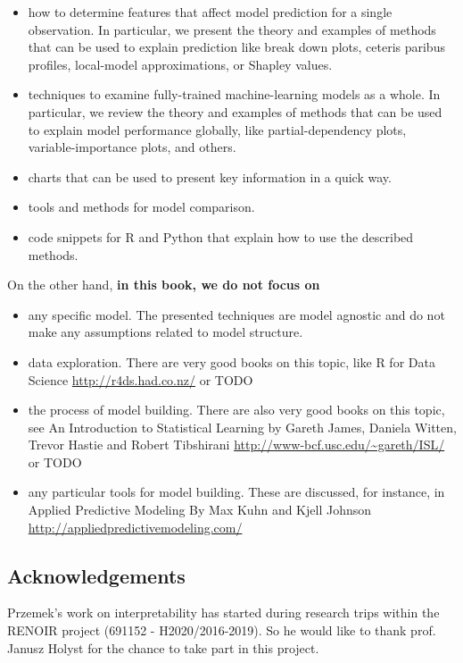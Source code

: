\documentclass[]{krantz}
\providecommand{\tightlist}{%
  \setlength{\itemsep}{0pt}\setlength{\parskip}{0pt}}
\theoremstyle{definition}
\theoremstyle{definition}
\theoremstyle{definition}
\theoremstyle{remark}
\begin{document}
\begin{itemize}
\tightlist
\item
  how to determine features that affect model prediction for a single
  observation. In particular, we present the theory and examples of
  methods that can be used to explain prediction like break down plots,
  ceteris paribus profiles, local-model approximations, or Shapley
  values.
\item
  techniques to examine fully-trained machine-learning models as a
  whole. In particular, we review the theory and examples of methods
  that can be used to explain model performance globally, like
  partial-dependency plots, variable-importance plots, and others.
\item
  charts that can be used to present key information in a quick way.
\item
  tools and methods for model comparison.
\item
  code snippets for R and Python that explain how to use the described
  methods.
\end{itemize}

On the other hand, \textbf{in this book, we do not focus on}

\begin{itemize}
\tightlist
\item
  any specific model. The presented techniques are model agnostic and do
  not make any assumptions related to model structure.
\item
  data exploration. There are very good books on this topic, like R for
  Data Science \url{http://r4ds.had.co.nz/} or TODO
\item
  the process of model building. There are also very good books on this
  topic, see An Introduction to Statistical Learning by Gareth James,
  Daniela Witten, Trevor Hastie and Robert Tibshirani
  \url{http://www-bcf.usc.edu/~gareth/ISL/} or TODO
\item
  any particular tools for model building. These are discussed, for
  instance, in Applied Predictive Modeling By Max Kuhn and Kjell Johnson
  \url{http://appliedpredictivemodeling.com/}
\end{itemize}

\hypertarget{thanksto}{%
\subsection{Acknowledgements}\label{thanksto}}

Przemek's work on interpretability has started during research trips
within the RENOIR project (691152 - H2020/2016-2019). So he would like
to thank prof. Janusz Holyst for the chance to take part in this
project.
\end{document}
